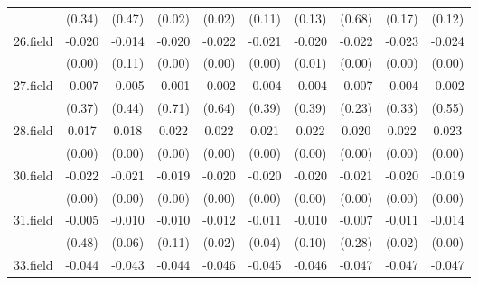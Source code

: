 {\begin{tabular}{l*{9}{c}}
          &   (0.34)         &   (0.47)         &   (0.02)         &   (0.02)         &   (0.11)         &   (0.13)         &   (0.68)         &   (0.17)         &   (0.12)         \\
[1em]
26.field  &   -0.020\sym{***}&   -0.014         &   -0.020\sym{**} &   -0.022\sym{***}&   -0.021\sym{**} &   -0.020\sym{**} &   -0.022\sym{***}&   -0.023\sym{***}&   -0.024\sym{***}\\
          &   (0.00)         &   (0.11)         &   (0.00)         &   (0.00)         &   (0.00)         &   (0.01)         &   (0.00)         &   (0.00)         &   (0.00)         \\
[1em]
27.field  &   -0.007         &   -0.005         &   -0.001         &   -0.002         &   -0.004         &   -0.004         &   -0.007         &   -0.004         &   -0.002         \\
          &   (0.37)         &   (0.44)         &   (0.71)         &   (0.64)         &   (0.39)         &   (0.39)         &   (0.23)         &   (0.33)         &   (0.55)         \\
[1em]
28.field  &    0.017\sym{**} &    0.018\sym{***}&    0.022\sym{***}&    0.022\sym{***}&    0.021\sym{***}&    0.022\sym{***}&    0.020\sym{***}&    0.022\sym{***}&    0.023\sym{***}\\
          &   (0.00)         &   (0.00)         &   (0.00)         &   (0.00)         &   (0.00)         &   (0.00)         &   (0.00)         &   (0.00)         &   (0.00)         \\
[1em]
30.field  &   -0.022\sym{***}&   -0.021\sym{***}&   -0.019\sym{***}&   -0.020\sym{***}&   -0.020\sym{***}&   -0.020\sym{***}&   -0.021\sym{***}&   -0.020\sym{***}&   -0.019\sym{***}\\
          &   (0.00)         &   (0.00)         &   (0.00)         &   (0.00)         &   (0.00)         &   (0.00)         &   (0.00)         &   (0.00)         &   (0.00)         \\
[1em]
31.field  &   -0.005         &   -0.010         &   -0.010         &   -0.012\sym{*}  &   -0.011\sym{*}  &   -0.010         &   -0.007         &   -0.011\sym{*}  &   -0.014\sym{**} \\
          &   (0.48)         &   (0.06)         &   (0.11)         &   (0.02)         &   (0.04)         &   (0.10)         &   (0.28)         &   (0.02)         &   (0.00)         \\
[1em]
33.field  &   -0.044\sym{***}&   -0.043\sym{***}&   -0.044\sym{***}&   -0.046\sym{***}&   -0.045\sym{***}&   -0.046\sym{***}&   -0.047\sym{***}&   -0.047\sym{***}&   -0.047\sym{***}\\

\end{tabular}}
